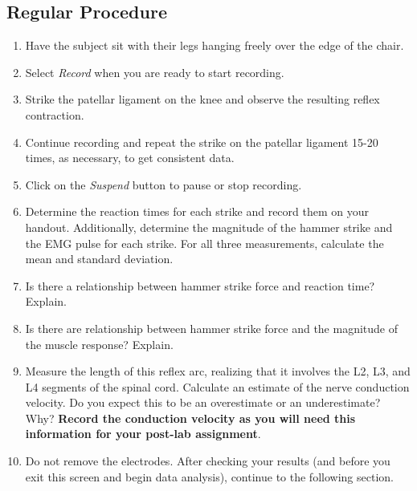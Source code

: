 \documentclass{article}
\begin{document}
\subsection*{Regular Procedure}
\begin{enumerate}	
	\item Have the subject sit with their legs hanging freely over the edge of the chair.
	\item Select \textit{Record} when you are ready to start recording.
	\item Strike the patellar ligament on the knee and observe the resulting reflex contraction.
	\item Continue recording and repeat the strike on the patellar ligament 15-20 times, as necessary, to get consistent data.
	\item Click on the \textit{Suspend} button to pause or stop recording.
	\item Determine the reaction times for each strike and record them on your handout. Additionally, determine the magnitude of the hammer strike and the EMG pulse for each strike. For all three measurements, calculate the mean and standard deviation.
	\item Is there a relationship between hammer strike force and reaction time? Explain.
	\item Is there are relationship between hammer strike force and the magnitude of the muscle response? Explain.
	\item Measure the length of this reflex arc, realizing that it involves the L2, L3, and L4 segments of the spinal cord. Calculate an estimate of the nerve conduction velocity. Do you expect this to be an overestimate or an underestimate? Why? \textbf{Record the conduction velocity as you will need this information for your post-lab assignment}.
	\item Do not remove the electrodes. After checking your results (and before you exit this screen and begin data analysis), continue to the following section.
\end{enumerate}
\end{document}
